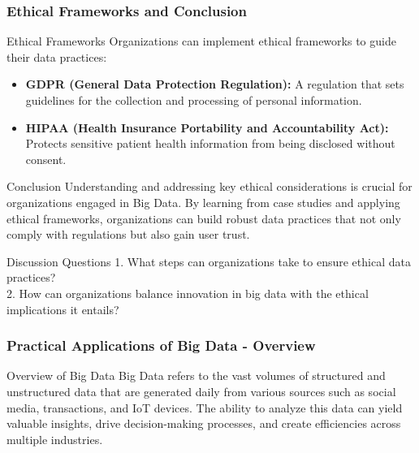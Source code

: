 \documentclass[aspectratio=169]{beamer}
\begin{document}
\begin{frame}[fragile]
    \frametitle{Ethical Frameworks and Conclusion}
    \begin{block}{Ethical Frameworks}
        Organizations can implement ethical frameworks to guide their data practices:
        \begin{itemize}
            \item \textbf{GDPR (General Data Protection Regulation):} A regulation that sets guidelines for the collection and processing of personal information.
            \item \textbf{HIPAA (Health Insurance Portability and Accountability Act):} Protects sensitive patient health information from being disclosed without consent.
        \end{itemize}
    \end{block}

    \begin{block}{Conclusion}
        Understanding and addressing key ethical considerations is crucial for organizations engaged in Big Data. By learning from case studies and applying ethical frameworks, organizations can build robust data practices that not only comply with regulations but also gain user trust.
    \end{block}

    \begin{block}{Discussion Questions}
        1. What steps can organizations take to ensure ethical data practices? \\
        2. How can organizations balance innovation in big data with the ethical implications it entails?
    \end{block}
\end{frame}

\begin{frame}[fragile]
    \frametitle{Practical Applications of Big Data - Overview}
    \begin{block}{Overview of Big Data}
        Big Data refers to the vast volumes of structured and unstructured data that are generated daily from various sources such as social media, transactions, and IoT devices. The ability to analyze this data can yield valuable insights, drive decision-making processes, and create efficiencies across multiple industries.
    \end{block}
\end{frame}
\end{document}
